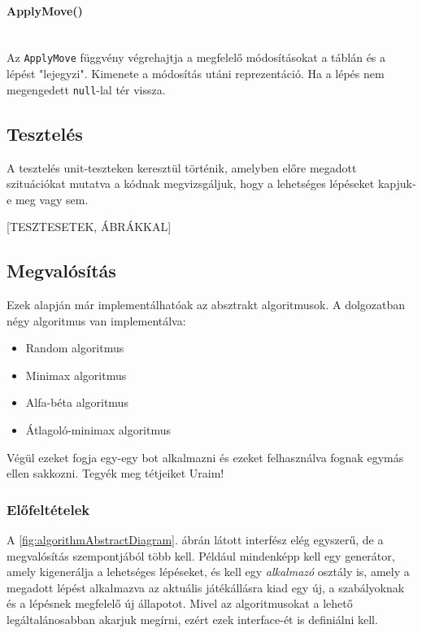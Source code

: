 \documentclass[twoside, a4paper, 12pt]{article}
\begin{document}
\paragraph{ApplyMove()} \mbox{} \\
Az \texttt{ApplyMove} függvény végrehajtja a megfelelő módosításokat a táblán és a lépést "lejegyzi". Kimenete a módosítás utáni reprezentáció. Ha a lépés nem megengedett \texttt{null}-lal tér vissza.

\subsection{Tesztelés}

A tesztelés unit-teszteken keresztül történik, amelyben előre megadott szituációkat mutatva a kódnak megvizsgáljuk, hogy a lehetséges lépéseket kapjuk-e meg vagy sem.

[TESZTESETEK, ÁBRÁKKAL]




\newpage




\subsection{Megvalósítás}
Ezek alapján már implementálhatóak az absztrakt algoritmusok. A dolgozatban négy algoritmus van implementálva:
\begin{itemize}
	\item Random algoritmus
	\item Minimax algoritmus
	\item Alfa-béta algoritmus
	\item Átlagoló-minimax algoritmus
\end{itemize}

Végül ezeket fogja egy-egy bot alkalmazni és ezeket felhasználva fognak egymás ellen sakkozni. Tegyék meg tétjeiket Uraim!

\subsubsection{Előfeltételek}
A \ref{fig:algorithmAbstractDiagram}. ábrán látott interfész elég egyszerű, de a megvalósítás szempontjából több kell. Például mindenképp kell egy generátor, amely kigenerálja a lehetséges lépéseket, és kell egy \textit{alkalmazó} osztály is, amely a megadott lépést alkalmazva az aktuális játékállásra kiad egy új, a szabályoknak és a lépésnek megfelelő új állapotot. Mivel az algoritmusokat a lehető legáltalánosabban akarjuk megírni, ezért ezek interface-ét is definiálni kell.
\end{document}
